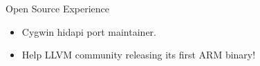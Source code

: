 \documentclass{resume} %
\begin{document}

\begin{rSection}{Open Source Experience}

\item 
\begin{itemize}
\item Cygwin hidapi port maintainer.
\item Help LLVM community releasing its first ARM binary!
\end{itemize}

\end{rSection}




\end{document}
